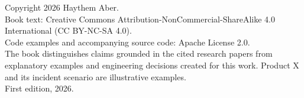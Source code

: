 \thispagestyle{empty}
\vspace*{\fill}
\noindent Copyright \textcopyright{} 2026 Haythem Aber.\\
\noindent Book text: Creative Commons Attribution-NonCommercial-ShareAlike 4.0 International (CC BY-NC-SA 4.0).\\
\noindent Code examples and accompanying source code: Apache License 2.0.\\[0.5em]
\noindent The book distinguishes claims grounded in the cited research papers from explanatory examples and engineering decisions created for this work. Product X and its incident scenario are illustrative examples.\\[0.5em]
\noindent First edition, 2026.
\vspace*{\fill}
\clearpage
